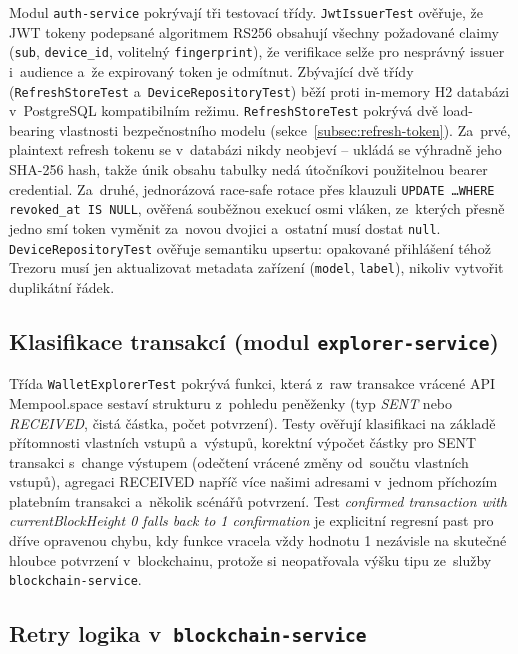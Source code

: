 Modul \texttt{auth-service} pokrývají tři testovací třídy.
\texttt{JwtIssuerTest} ověřuje, že JWT tokeny podepsané algoritmem
RS256 obsahují všechny
požadované claimy (\texttt{sub}, \texttt{device\_id}, volitelný
\texttt{fingerprint}), že verifikace selže pro nesprávný issuer
i~audience a~že expirovaný token je odmítnut. Zbývající dvě třídy
(\texttt{Refresh\-StoreTest} a~\texttt{Device\-RepositoryTest}) běží
proti in-memory H2 databázi v~PostgreSQL kompatibilním režimu.
\texttt{Refresh\-StoreTest} pokrývá dvě load-bearing vlastnosti
bezpečnostního modelu (sekce~\ref{subsec:refresh-token}). Za~prvé,
plaintext refresh tokenu se v~databázi nikdy neobjeví -- ukládá se
výhradně jeho SHA-256 hash, takže únik obsahu tabulky nedá útočníkovi
použitelnou bearer credential. Za~druhé, jednorázová race-safe rotace
přes klauzuli \texttt{UPDATE \ldots WHERE revoked\_at IS NULL}, ověřená
souběžnou exekucí osmi vláken, ze~kterých přesně jedno smí token
vyměnit za~novou dvojici a~ostatní musí dostat \texttt{null}.
\texttt{Device\-RepositoryTest} ověřuje semantiku upsertu: opakované
přihlášení téhož Trezoru musí jen aktualizovat metadata zařízení
(\texttt{model}, \texttt{label}), nikoliv vytvořit duplikátní řádek.

\subsection[Klasifikace transakcí]{Klasifikace transakcí
(modul \texttt{explorer-service})}
\label{subsec:test-explorer}

Třída \texttt{WalletExplorerTest} pokrývá funkci, která z~raw transakce
vrácené API Mempool.space sestaví
strukturu z~pohledu peněženky (typ \emph{SENT} nebo \emph{RECEIVED},
čistá částka, počet potvrzení). Testy ověřují klasifikaci na základě
přítomnosti vlastních vstupů a~výstupů, korektní výpočet částky pro
SENT transakci s~change výstupem (odečtení vrácené změny od~součtu
vlastních vstupů), agregaci RECEIVED napříč více našimi adresami
v~jednom příchozím platebním transakci a~několik scénářů potvrzení.
Test \emph{confirmed transaction with currentBlockHeight 0 falls back
to 1 confirmation} je explicitní regresní past pro dříve opravenou
chybu, kdy funkce vracela vždy hodnotu 1 nezávisle na skutečné
hloubce potvrzení v~blockchainu, protože si neopatřovala výšku tipu
ze~služby \texttt{blockchain-service}.

\subsection[Retry logika v~blockchain-service]{Retry logika
v~\texttt{blockchain-service}}
\label{subsec:test-blockchain}

